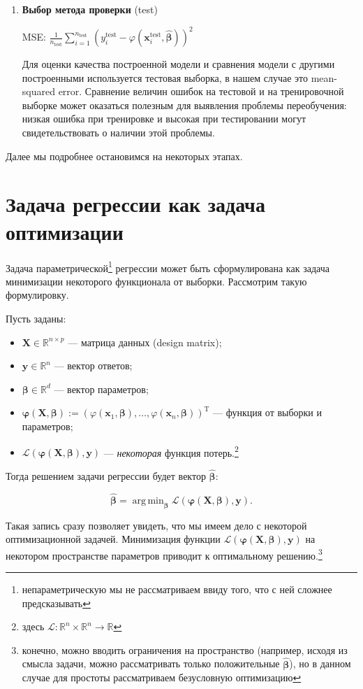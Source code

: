 \documentclass[12pt,a4paper,final]{article}
\newcommand{\betah}{\hat{\bm \beta}}
\newcommand{\betaa}{\bm{\beta}}
\newcommand{\X}{\bm{X}}
\newcommand{\1}{\mathds{1}}
\DeclareMathOperator*{\argmin}{arg\,min}
\begin{document}
\begin{enumerate}
	\item \textbf{Выбор метода проверки} (test)

{\color{gray} MSE: $\tfrac{1}{n_{\text{test}}}\sum_{i = 1}^{n_{\text{test}}}(y^{\text{test}}_i - \varphi(\mathbf x_i^{\text{test}}, \betah))^2$}

Для оценки качества построенной модели и сравнения модели с другими построенными используется тестовая выборка, в нашем случае это mean-squared error. Сравнение величин ошибок на тестовой и на тренировочной выборке может оказаться полезным для выявления проблемы переобучения: низкая ошибка при тренировке и высокая при тестировании могут свидетельствовать о наличии этой проблемы.

\end{enumerate}            

Далее мы подробнее остановимся на некоторых этапах.

\section{Задача регрессии как задача оптимизации}

Задача параметрической\footnote{непараметрическую мы не рассматриваем ввиду того, что с ней сложнее предсказывать} регрессии может быть сформулирована как задача минимизации некоторого функционала от выборки.
Рассмотрим такую формулировку.

 Пусть заданы:
\begin{itemize}
	\item $\X \in \mathbb R^{n \times p}$ --- матрица данных (design matrix);
	\item $\bm y \in \mathbb R^n$ --- вектор ответов;
	\item $\betaa \in \mathbb R^d$ --- вектор параметров;
	\item $\bm \varphi(\X, \betaa) := (\varphi(\mathbf x_1, \betaa),\ldots, \varphi(\mathbf x_n, \betaa) )^\mathrm T$ --- функция от выборки и параметров;	\item $\mathcal L(\bm \varphi(\X, \betaa), \bm y)$ --- \textit{некоторая} функция потерь.\footnote{здесь
	$\mathcal L: \mathbb R^{n} \times \mathbb R^n \rightarrow \mathbb R$
	}
\end{itemize}

Тогда решением задачи регрессии будет вектор $\betah$:

$$\betah = \argmin_{\betaa}{\mathcal L(\bm \varphi(\X, \betaa), \bm y)}.$$

Такая запись сразу позволяет увидеть, что мы имеем дело с некоторой оптимизационной задачей. Минимизация функции $\mathcal L(\bm \varphi(\X, \betaa), \bm y)$ на некотором пространстве параметров приводит к оптимальному решению.\footnote{конечно, можно вводить ограничения на пространство (например, исходя из смысла задачи, можно рассматривать только положительные $\betah$), но в данном случае для простоты рассматриваем безусловную оптимизацию} 
\end{document}
